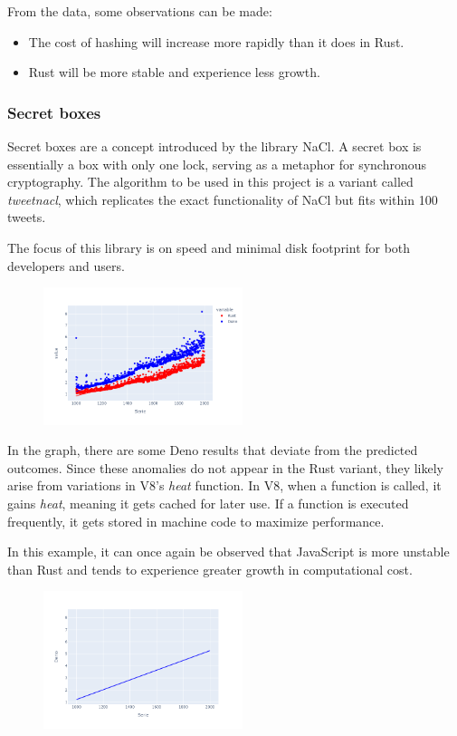 \documentclass[12pt, letterpaper]{article}
\begin{document}
\begin{multicols}{2}
    From the data, some observations can be made:
    \begin{itemize}
        \item The cost of hashing will increase more rapidly than it does in Rust.
        \item Rust will be more stable and experience less growth.
    \end{itemize}

    \subsubsection{Secret boxes}

    Secret boxes are a concept introduced by the library NaCl. A secret box is essentially a box with only one lock, serving as a metaphor for synchronous cryptography. The algorithm to be used in this project is a variant called \textit{tweetnacl}, which replicates the exact functionality of NaCl but fits within 100 tweets.

    The focus of this library is on speed and minimal disk footprint for both developers and users.

    \begin{figure}[H]
        \centering
        \includegraphics[width=0.52\textwidth]{images/secretbox_lines}
    \end{figure}

    In the graph, there are some Deno results that deviate from the predicted outcomes. Since these anomalies do not appear in the Rust variant, they likely arise from variations in V8's \textit{heat} function. In V8, when a function is called, it gains \textit{heat}, meaning it gets cached for later use. If a function is executed frequently, it gets stored in machine code to maximize performance.

    In this example, it can once again be observed that JavaScript is more unstable than Rust and tends to experience greater growth in computational cost.

    \begin{figure}[H]
        \centering
        \includegraphics[width=0.52\textwidth]{trend_secretbox_deno}
    \end{figure}


\end{multicols}
\end{document}
